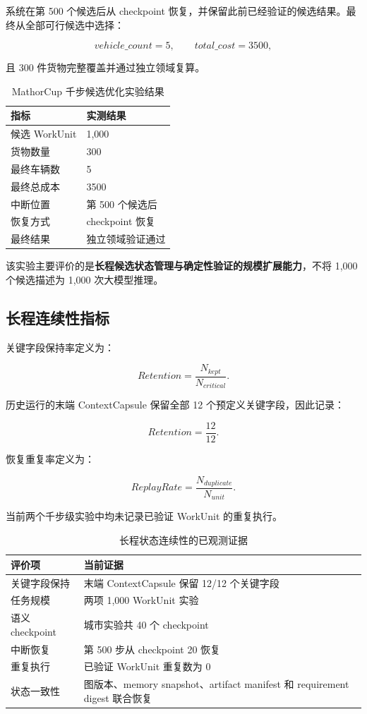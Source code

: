 \documentclass[UTF8,a4paper,12pt,oneside]{ctexbook}
\begin{document}
系统在第 500 个候选后从 checkpoint 恢复，并保留此前已经验证的候选结果。最终从全部可行候选中选择：

\[
vehicle\_count=5,
\qquad
total\_cost=3500,
\]

且 300 件货物完整覆盖并通过独立领域复算。

\begin{table}[htbp]
\centering
\caption{MathorCup 千步候选优化实验结果}
\label{tab:mathorcup-1000-results}
\begin{tabular}{p{}p{}}
\toprule
指标 & 实测结果\\
\midrule
候选 WorkUnit & 1,000\\
货物数量 & 300\\
最终车辆数 & 5\\
最终总成本 & 3500\\
中断位置 & 第 500 个候选后\\
恢复方式 & checkpoint 恢复\\
最终结果 & 独立领域验证通过\\
\bottomrule
\end{tabular}
\end{table}

该实验主要评价的是\textbf{长程候选状态管理与确定性验证的规模扩展能力}，不将 1,000 个候选描述为 1,000 次大模型推理。


\subsection{长程连续性指标}

关键字段保持率定义为：

\[
Retention
=
\frac{N_{kept}}{N_{critical}}.
\]

历史运行的末端 ContextCapsule 保留全部 12 个预定义关键字段，因此记录：

\[
Retention=\frac{12}{12}.
\]

恢复重复率定义为：

\[
ReplayRate
=
\frac{N_{duplicate}}{N_{unit}}.
\]

当前两个千步级实验中均未记录已验证 WorkUnit 的重复执行。

\begin{table}[htbp]
\centering
\caption{长程状态连续性的已观测证据}
\label{tab:long-horizon-continuity}
\begin{tabularx}{0.95\textwidth}{p{}X}
\toprule
评价项 & 当前证据\\
\midrule
关键字段保持 & 末端 ContextCapsule 保留 12/12 个关键字段\\
任务规模 & 两项 1,000 WorkUnit 实验\\
语义 checkpoint & 城市实验共 40 个 checkpoint\\
中断恢复 & 第 500 步从 checkpoint 20 恢复\\
重复执行 & 已验证 WorkUnit 重复数为 0\\
状态一致性 & 图版本、memory snapshot、artifact manifest 和 requirement digest 联合恢复\\
\bottomrule
\end{tabularx}
\end{table}
\end{document}
